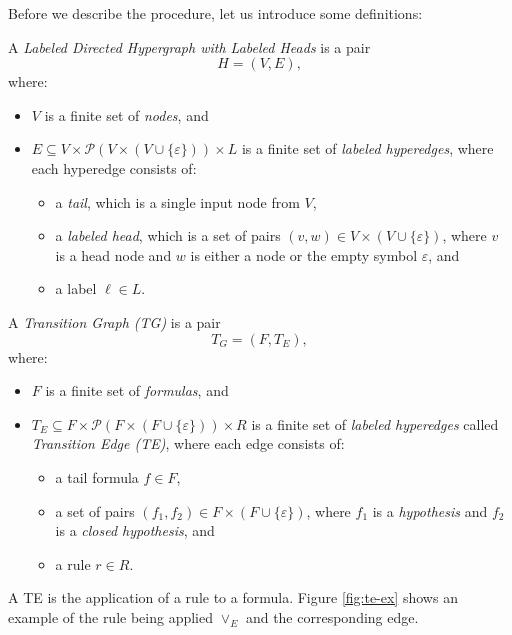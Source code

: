 Before we describe the procedure, let us introduce some definitions:
\begin{definition}
A \emph{Labeled Directed Hypergraph with Labeled Heads} is a pair
\[
H = (V, E),
\]
where:
\begin{itemize}
  \item \( V \) is a finite set of \emph{nodes}, and
  \item \( E \subseteq V \times \mathcal{P}(V \times (V \cup \{\varepsilon\})) \times L \) is a finite set of \emph{labeled hyperedges}, where each hyperedge consists of:
  \begin{itemize}
    \item a \emph{tail}, which is a single input node from \( V \),
    \item a \emph{labeled head}, which is a set of pairs \( (v, w) \in V \times (V \cup \{\varepsilon\}) \), where \( v \) is a head node and \( w \) is either a node or the empty symbol \( \varepsilon \), and
    \item a label \( \ell \in L \).
  \end{itemize}
\end{itemize}
\end{definition}

\begin{definition}
A \emph{Transition Graph (TG)} is a pair
\[
T_G = (F, T_E),
\]
where:
\begin{itemize}
  \item \( F \) is a finite set of \emph{formulas}, and
  \item \( T_E \subseteq F \times \mathcal{P}(F \times (F \cup \{\varepsilon\})) \times R \) is a finite set of \emph{labeled hyperedges} called \emph{Transition Edge (TE)}, where each edge consists of:
  \begin{itemize}
    \item a tail formula \( f \in F \),
    \item a set of pairs \( (f_1, f_2) \in F \times (F \cup \{\varepsilon\}) \), where \( f_1 \) is a \emph{hypothesis} and \( f_2 \) is a \emph{closed hypothesis}, and
    \item a rule \( r \in R \).
  \end{itemize}
\end{itemize}
\end{definition}

A TE is the application of a rule to a formula. Figure \ref{fig:te-ex} shows an example of the rule being applied \(\vee_E\) and the corresponding edge.

